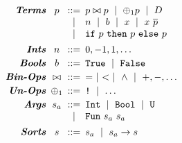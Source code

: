 $$
\arraycolsep=2.5pt
\begin{array}{rccl}
\emphbf{Terms}& \pred
  & ::=    & \pred \binop \pred \spmid \unop \pred \spmid \dc \\
  && \spmid & n \spmid b \spmid x \spmid  x\ \overline{\pred}\\
  && \spmid & \eif{\pred}{\pred}{\pred}
\\[0.06in]

\emphbf{Ints} & n
  & ::= & 0, -1, 1, \dots
\\[0.03in]

\emphbf{Bools}& b
  & ::= & \etrue \spmid \efalse
\\[0.03in]

\emphbf{Bin-Ops}& \binop
  & ::= & = \spmid < \spmid \land \spmid +, - , \dots
\\[0.03in]

\emphbf{Un-Ops}& \unop
  & ::= & \lnot \spmid \dots
\\[0.03in]

\emphbf{Args}& \sort_a
  & ::= & \tint \spmid \tbool \spmid \tuniv \\
  && \spmid & \tsmtfun{\sort_a}{\sort_a}
\\[0.06in]

\emphbf{Sorts} & \sort
  & ::=    & \sort_a \spmid \sort_a \rightarrow \sort
\end{array}
$$
